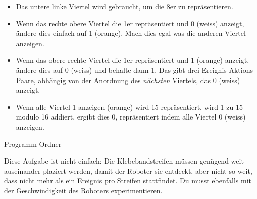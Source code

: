 \begin{itemize}
\item Das untere linke Viertel wird gebraucht, um die 8er zu repräsentieren.

\item Wenn das rechte obere Viertel die 1er repräsentiert und 0 (weiss) anzeigt, ändere dies einfach auf 1 (orange). Mach dies egal was die anderen Viertel anzeigen.
\item Wenn das obere rechte Viertel die 1er repräsentiert und 1 (orange) anzeigt, ändere dies auf 0 (weiss) und behalte dann 1. Das gibt drei Ereignis-Aktions Paare, abhängig von der Anordnung des  \emph{nächsten} Viertels, das 0 (weiss) anzeigt. 
\item Wenn alle Viertel 1 anzeigen (orange) wird 15 repräsentiert, wird 1 zu 15 modulo 16 addiert, ergibt dies 0, repräsentiert indem alle Viertel 0 (weiss) anzeigen.
\end{itemize}


{\raggedleft \hfill Programm Ordner }



Diese Aufgabe ist nicht einfach: Die Klebebandstreifen müssen genügend weit auseinander plaziert werden, damit der Roboter sie entdeckt, aber nicht so weit, dass nicht mehr als ein Ereignis pro Streifen stattfindet. Du musst ebenfalls mit der Geschwindigkeit des Roboters experimentieren.
